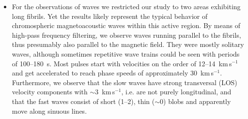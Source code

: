 \begin{itemize}
\item For the observations of waves we restricted our study to two areas exhibiting long fibrils. Yet the results likely represent the typical behavior of chromospheric magnetoacoustic waves within this active region.  By means of high-pass frequency filtering, we observe waves running parallel to the fibrils, thus presumably also parallel to the magnetic field. They were mostly solitary waves, although sometimes repetitive wave trains could be seen with periods of 100--180~s. Most pulses start with velocities on the order of 12--14~km\,s$^{-1}$ and get accelerated to reach phase speeds of approximately 30~km\,s$^{-1}$.  Furthermore, we observe that the slow waves have strong transversal (LOS) velocity components with $\sim$3~km\,s$^{-1}$, i.e. are not purely longitudinal, and that the fast waves consist of short (1\arcsec--2\arcsec), thin ($\sim$0) blobs and apparently move along sinuous lines. 
\end{itemize}

